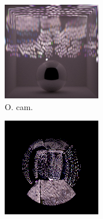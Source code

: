 \begin{figure}[]
\begin{subfigure}{\textwidth}
\begin{subfigure}{0.19\textwidth}
            \centering
            \includegraphics[width=\textwidth]{images/04-experiment03/ball_dof/beams/stats_proj.jpg}
            \caption*{O. cam.}
        \end{subfigure}
        \hfill
        \begin{subfigure}{0.19\textwidth}
            \centering
            \includegraphics[width=\textwidth]{images/04-experiment03/ball_dof/beams/pixel_im.jpg}

\end{subfigure}
\end{subfigure}
\end{figure}
